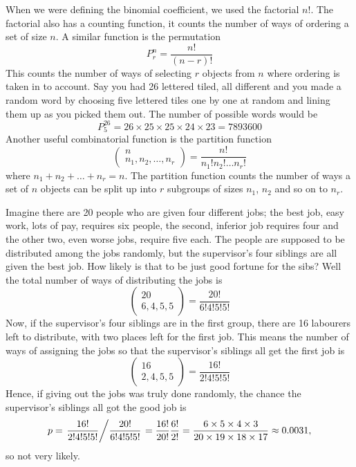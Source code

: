 \documentclass[11pt,a4paper]{scrartcl}
\begin{document}
When we were defining the binomial coefficient, we used the factorial
$n!$. The factorial also has a counting function, it counts the number
of ways of ordering a set of size $n$. A similar function is the permutation
\begin{equation}
P^n_r=\frac{n!}{(n-r)!}
\end{equation}
This counts the number of ways of selecting $r$ objects from $n$ where
ordering is taken in to account. Say you had 26 lettered tiled, all
different and you made a random word by choosing five lettered tiles one by one at
random and lining them up as you picked them out. The number of possible words would be
\begin{equation}
P^{26}_5=26\times 25\times 25\times 24\times 23=7893600
\end{equation}
Another useful combinatorial function is the partition function
\begin{equation}
\left(\begin{array}{c} n\\n_1,n_2,\ldots,n_r\end{array}\right)=\frac{n!}{n_1!n_2!\ldots n_r!}
\end{equation}
where $n_1+n_2+\ldots+n_r=n$. The partition function counts the number
of ways a set of $n$ objects can be split up into $r$ subgroups of
sizes $n_1$, $n_2$ and so on to $n_r$.

Imagine there are 20 people who are given four different jobs; the best
job, easy work, lots of pay, requires six people, the second,
inferior job requires four and the other two, even worse jobs, require
five each. The people are supposed to be distributed among the jobs
randomly, but the supervisor's four siblings are all given the best
job. How likely is that to be just good fortune for the sibs? Well the
total number of ways of distributing the jobs is
\begin{equation}
\left(\begin{array}{c} 20\\6,4,5,5\end{array}\right)=\frac{20!}{6!4!5!5!}
\end{equation}
Now, if the supervisor's four siblings are in the first group, there
are 16 labourers left to distribute, with two places left for the first job. This means the number of ways of assigning the jobs so that the supervisor's siblings all get the first job is
\begin{equation}
\left(\begin{array}{c} 16\\2,4,5,5\end{array}\right)=\frac{16!}{2!4!5!5!}
\end{equation}
Hence, if giving out the jobs was truly done randomly, the chance the supervisor's siblings all got the good job is
\begin{equation}
p=\left.\frac{16!}{2!4!5!5!}\middle/\frac{20!}{6!4!5!5!}\right.=\frac{16!}{20!}\frac{6!}{2!}
=\frac{6\times 5\times 4\times 3}{20\times 19\times 18\times 17}
\approx 0.0031,
\end{equation}
so not very likely.
\newpage




\end{document}
